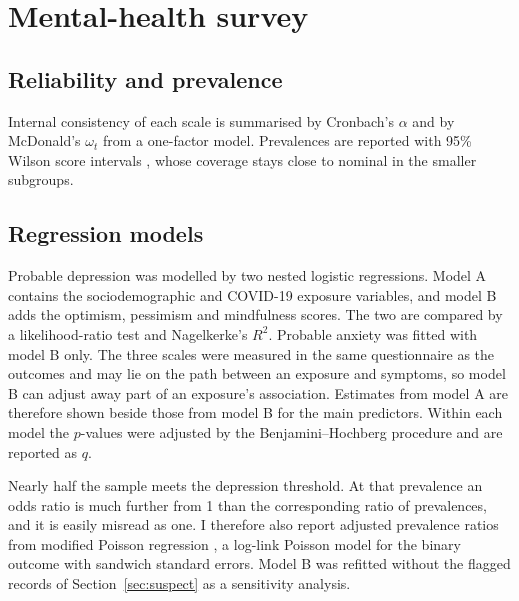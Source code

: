 \section{Mental-health survey}
\subsection{Reliability and prevalence}
Internal consistency of each scale is summarised by Cronbach's $\alpha$ \parencite{cronbach1951} and by McDonald's $\omega_t$ from a one-factor model. Prevalences are reported with 95\% Wilson score intervals \parencite{wilson1927}, whose coverage stays close to nominal in the smaller subgroups.

\subsection{Regression models}\label{sec:mh-methods}
Probable depression was modelled by two nested logistic regressions. Model A contains the sociodemographic and COVID-19 exposure variables, and model B adds the optimism, pessimism and mindfulness scores. The two are compared by a likelihood-ratio test and Nagelkerke's $R^2$. Probable anxiety was fitted with model B only. The three scales were measured in the same questionnaire as the outcomes and may lie on the path between an exposure and symptoms, so model B can adjust away part of an exposure's association. Estimates from model A are therefore shown beside those from model B for the main predictors. Within each model the $p$-values were adjusted by the Benjamini--Hochberg procedure and are reported as $q$.

Nearly half the sample meets the depression threshold. At that prevalence an odds ratio is much further from 1 than the corresponding ratio of prevalences, and it is easily misread as one. I therefore also report adjusted prevalence ratios from modified Poisson regression \parencite{zou2004}, a log-link Poisson model for the binary outcome with sandwich standard errors. Model B was refitted without the flagged records of Section~\ref{sec:suspect} as a sensitivity analysis.

